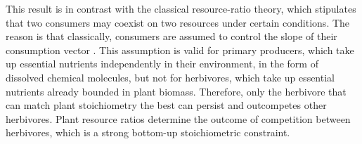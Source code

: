 \documentclass[12pt]{article}
\begin{document}
\par
This result is in contrast with the classical resource-ratio theory, which stipulates that two consumers may coexist on two resources under certain conditions. The reason is that classically, consumers are assumed to control the slope of their consumption vector \citep{Tilman1982}. This assumption is valid for primary producers, which take up essential nutrients independently in their environment, in the form of dissolved chemical molecules, but not for herbivores, which take up essential nutrients already bounded in plant biomass. Therefore, %
only the herbivore that can match plant stoichiometry the best can persist and outcompetes other herbivores. Plant resource ratios determine the outcome of competition between herbivores, which is a strong bottom-up stoichiometric constraint. 
\par
\end{document}
